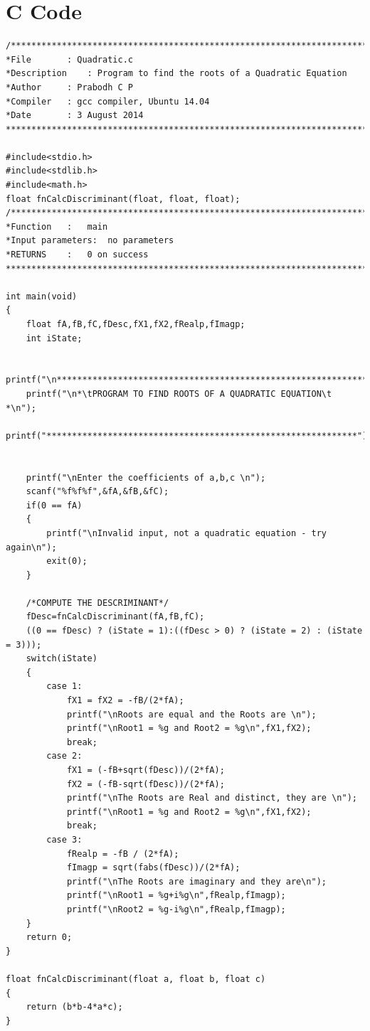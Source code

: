 \documentclass[a4paper]{report}
\begin{document}
\section*{C Code}
\begin{Verbatim}
/***************************************************************************
*File		: Quadratic.c
*Description	: Program to find the roots of a Quadratic Equation
*Author		: Prabodh C P
*Compiler	: gcc compiler, Ubuntu 14.04
*Date		: 3 August 2014
***************************************************************************/

#include<stdio.h>
#include<stdlib.h>
#include<math.h>
float fnCalcDiscriminant(float, float, float);
/***************************************************************************
*Function	: 	main
*Input parameters:	no parameters
*RETURNS	:	0 on success
***************************************************************************/

int main(void)
{
	float fA,fB,fC,fDesc,fX1,fX2,fRealp,fImagp;
	int iState;

	printf("\n*************************************************************");
	printf("\n*\tPROGRAM TO FIND ROOTS OF A QUADRATIC EQUATION\t    *\n");
	printf("*************************************************************");


	printf("\nEnter the coefficients of a,b,c \n");
	scanf("%f%f%f",&fA,&fB,&fC);
	if(0 == fA)
	{
		printf("\nInvalid input, not a quadratic equation - try again\n");
		exit(0);
	}

	/*COMPUTE THE DESCRIMINANT*/
	fDesc=fnCalcDiscriminant(fA,fB,fC);
	((0 == fDesc) ? (iState = 1):((fDesc > 0) ? (iState = 2) : (iState = 3)));
	switch(iState)
	{
		case 1:
			fX1 = fX2 = -fB/(2*fA);
			printf("\nRoots are equal and the Roots are \n");
			printf("\nRoot1 = %g and Root2 = %g\n",fX1,fX2);
			break;
		case 2:
			fX1 = (-fB+sqrt(fDesc))/(2*fA);
			fX2 = (-fB-sqrt(fDesc))/(2*fA);
			printf("\nThe Roots are Real and distinct, they are \n");
			printf("\nRoot1 = %g and Root2 = %g\n",fX1,fX2);
			break;
		case 3:
			fRealp = -fB / (2*fA);
			fImagp = sqrt(fabs(fDesc))/(2*fA);
			printf("\nThe Roots are imaginary and they are\n");
			printf("\nRoot1 = %g+i%g\n",fRealp,fImagp);
			printf("\nRoot2 = %g-i%g\n",fRealp,fImagp);
	}
	return 0;
}

float fnCalcDiscriminant(float a, float b, float c)
{
	return (b*b-4*a*c);
}
\end{Verbatim}
\pagebreak
\end{document}
